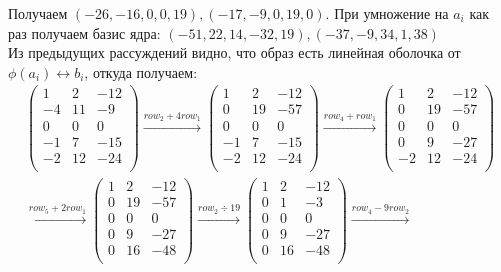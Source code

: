 \documentclass[a4paper,11pt]{article}
\begin{document}
Получаем $ (-26, -16, 0, 0, 19), (-17, -9, 0, 19, 0) $. При умножение на $ a_i $ как раз получаем базис ядра: $ (-51,  22,  14, -32,  19), (-37,  -9,  34,   1,  38) $ \\[1pt]
 Из предыдущих рассуждений видно, что образ есть линейная оболочка от  $ \phi(a_i) \leftrightarrow b_i $, откуда получаем:
\begin{gather*}
\begin{pmatrix}
1 & 2 & -12 \\
-4 & 11 & -9 \\
0 & 0 & 0 \\
-1 & 7 & -15 \\
-2 & 12 & -24 \\
\end{pmatrix}
\stackrel{ row_{2} + 4row_{1} }{\longrightarrow}
\begin{pmatrix}
1 & 2 & -12 \\
0 & 19 & -57 \\
0 & 0 & 0 \\
-1 & 7 & -15 \\
-2 & 12 & -24 \\
\end{pmatrix}
\stackrel{ row_{4} + row_{1} }{\longrightarrow}
\begin{pmatrix}
1 & 2 & -12 \\
0 & 19 & -57 \\
0 & 0 & 0 \\
0 & 9 & -27 \\
-2 & 12 & -24 \\
\end{pmatrix}
\\[3pt]
\stackrel{ row_{5} + 2row_{1} }{\longrightarrow}
\begin{pmatrix}
1 & 2 & -12 \\
0 & 19 & -57 \\
0 & 0 & 0 \\
0 & 9 & -27 \\
0 & 16 & -48 \\
\end{pmatrix}
\stackrel{ row_{2} \div 19 }{\longrightarrow}
\begin{pmatrix}
1 & 2 & -12 \\
0 & 1 & -3 \\
0 & 0 & 0 \\
0 & 9 & -27 \\
0 & 16 & -48 \\
\end{pmatrix}
\stackrel{ row_{4} - 9row_{2} }{\longrightarrow}

\end{gather*}
\end{document}
